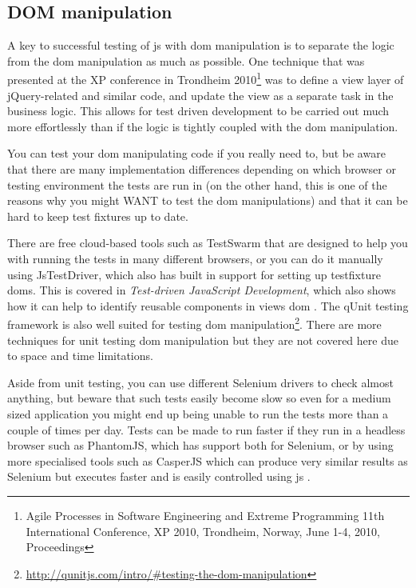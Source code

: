 \documentclass[11pt]{article}
\begin{document}
\subsection{DOM manipulation}

A key to successful testing of \gls{js} with \gls{dom} manipulation is to separate the logic from the \gls{dom} manipulation as much as possible. One technique that was presented at the XP conference in Trondheim 2010\footnote{Agile Processes in Software Engineering and Extreme Programming 11th International Conference, XP 2010, Trondheim, Norway, June 1-4, 2010, Proceedings} was to define a view layer of jQuery-related and similar code, and update the view as a separate task in the business logic. This allows for test driven development to be carried out much more effortlessly than if the logic is tightly coupled with the \gls{dom} manipulation. \cite[question~4]{Ahnve} %

You can test your \gls{dom} manipulating code if you really need to, but be aware that there are many implementation differences depending on which browser or testing environment the tests are run in (on the other hand, this is one of the reasons why you might WANT to test the \gls{dom} manipulations) and that it can be hard to keep test fixtures up to date.

There are free cloud-based tools such as TestSwarm that are designed to help you with running the tests in many different browsers, or you can do it manually using JsTestDriver, which also has built in support for setting up \gls{testfixture} \glspl{dom}. This is covered in \emph{Test-driven JavaScript Development}, which also shows how it can help to identify reusable components in views \gls{dom} \cite[p.~389-435]{Tddjs}. The qUnit testing framework is also well suited for testing \gls{dom} manipulation\footnote{\url{http://qunitjs.com/intro/\#testing-the-dom-manipulation}}. There are more techniques for unit testing \gls{dom} manipulation but they are not covered here due to space and time limitations.

Aside from unit testing, you can use different Selenium drivers to check almost anything, but beware that such tests easily become slow so even for a medium sized application you might end up being unable to run the tests more than a couple of times per day. Tests can be made to run faster if they run in a headless browser such as PhantomJS, which has support both for Selenium, or by using more specialised tools such as CasperJS which can produce very similar results as Selenium but executes faster and is easily controlled using \gls{js} \cite[p.~142-146]{TestableJS}.
\end{document}
